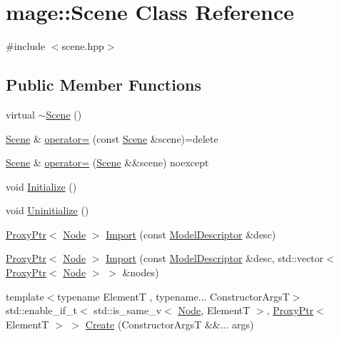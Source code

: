\hypertarget{classmage_1_1_scene}{}\section{mage\+:\+:Scene Class Reference}
\label{classmage_1_1_scene}


{\ttfamily \#include $<$scene.\+hpp$>$}

\subsection*{Public Member Functions}
\begin{DoxyCompactItemize}
\item 
virtual \hyperlink{classmage_1_1_scene_adc40910fdca62586659c2961fe7e7f3c}{$\sim$\+Scene} ()
\item 
\hyperlink{classmage_1_1_scene}{Scene} \& \hyperlink{classmage_1_1_scene_a2c25c0fedc0230771d8c00a8288a69ce}{operator=} (const \hyperlink{classmage_1_1_scene}{Scene} \&scene)=delete
\item 
\hyperlink{classmage_1_1_scene}{Scene} \& \hyperlink{classmage_1_1_scene_a0256a5b54db093088f40511cf61eb277}{operator=} (\hyperlink{classmage_1_1_scene}{Scene} \&\&scene) noexcept
\item 
void \hyperlink{classmage_1_1_scene_a3cd12ef381ca743bf0b8f8aa2a76eb57}{Initialize} ()
\item 
void \hyperlink{classmage_1_1_scene_a714dc33c04dc2b8e2cec93564905b174}{Uninitialize} ()
\item 
\hyperlink{classmage_1_1_proxy_ptr}{Proxy\+Ptr}$<$ \hyperlink{classmage_1_1_node}{Node} $>$ \hyperlink{classmage_1_1_scene_a4e503b8a952ec95ebd844ffde0b26e9f}{Import} (const \hyperlink{classmage_1_1_model_descriptor}{Model\+Descriptor} \&desc)
\item 
\hyperlink{classmage_1_1_proxy_ptr}{Proxy\+Ptr}$<$ \hyperlink{classmage_1_1_node}{Node} $>$ \hyperlink{classmage_1_1_scene_ac7b2c61b6f46696905ddaf4251a13fdd}{Import} (const \hyperlink{classmage_1_1_model_descriptor}{Model\+Descriptor} \&desc, std\+::vector$<$ \hyperlink{classmage_1_1_proxy_ptr}{Proxy\+Ptr}$<$ \hyperlink{classmage_1_1_node}{Node} $>$ $>$ \&nodes)
\item 
{\footnotesize template$<$typename ElementT , typename... Constructor\+ArgsT$>$ }\\std\+::enable\+\_\+if\+\_\+t$<$ std\+::is\+\_\+same\+\_\+v$<$ \hyperlink{classmage_1_1_node}{Node}, ElementT $>$, \hyperlink{classmage_1_1_proxy_ptr}{Proxy\+Ptr}$<$ ElementT $>$ $>$ \hyperlink{classmage_1_1_scene_a8ce3f5152ad4b0935a08cc2f0a53383c}{Create} (Constructor\+ArgsT \&\&... args)

\end{DoxyCompactItemize}
